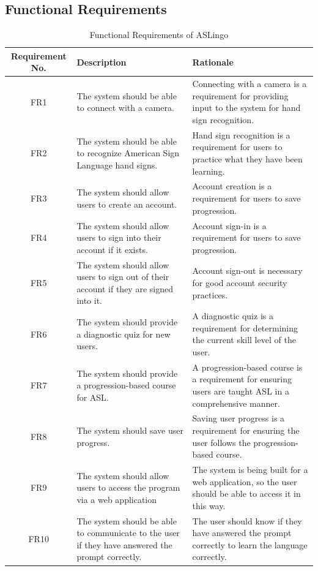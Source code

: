 \documentclass[12pt, titlepage]{article}
\begin{document}
\subsection{Functional Requirements}

\begin{longtable}{| c | p{4cm}| p{6cm}|}
    \caption{Functional Requirements of ASLingo} \\
    \hline
    \textbf{Requirement No.} & \textbf{Description} &\textbf{Rationale}\\
    \hline
    FR1 & The system should be able to connect with a camera. & Connecting with a camera is a requirement for providing input to the system for hand sign recognition. \\
    \hline
    FR2 & The system should be able to recognize American Sign Language hand signs. & Hand sign recognition is a requirement for users to practice what they have been learning. \\
    \hline
    FR3 & The system should allow users to create an account. & Account creation is a requirement for users to save progression. \\
    \hline
    FR4 & The system should allow users to sign into their account if it exists. & Account sign-in is a requirement for users to save progression. \\
    \hline
    FR5 & The system should allow users to sign out of their account if they are signed into it. & Account sign-out is necessary for good account security practices. \\
    \hline
    FR6 & The system should provide a diagnostic quiz for new users. & A diagnostic quiz is a requirement for determining the current skill level of the user. \\
    \hline
    FR7 & The system should provide a progression-based course for ASL. & A progression-based course is a requirement for ensuring users are taught ASL in a comprehensive manner. \\
    \hline
    FR8 & The system should save user progress. & Saving user progress is a requirement for ensuring the user follows the progression-based course. \\
    \hline
    FR9 & The system should allow users to access the program via a web application & The system is being built for a web application, so the user should be able to access it in this way. \\
    \hline
    FR10 & The system should be able to communicate to the user if they have answered the prompt correctly. & The user should know if they have answered the prompt correctly to learn the language correctly. \\ 

\end{longtable}
\end{document}
